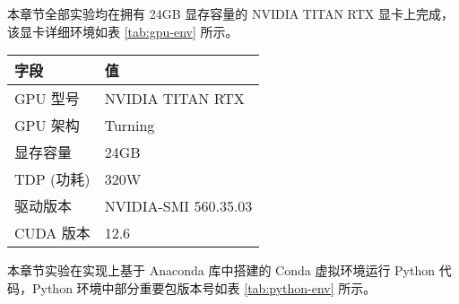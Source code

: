 本章节全部实验均在拥有 24GB 显存容量的 NVIDIA TITAN RTX 显卡上完成，该显卡详细环境如表 \ref{tab:gpu-env} 所示。

\begin{table*}[htbp]
\centering
\caption{实验显卡环境} \label{tab:gpu-env}
\begin{tabular}{ll}
\toprule
\textbf{字段} & \textbf{值}           \\ \midrule
GPU   型号    & NVIDIA TITAN RTX     \\
GPU   架构    & Turning              \\
显存容量        & 24GB                 \\
TDP   (功耗)  & 320W                 \\
驱动版本        & NVIDIA-SMI 560.35.03 \\
CUDA   版本   & 12.6                 \\ \bottomrule
\end{tabular}
\end{table*}

本章节实验在实现上基于 Anaconda 库中搭建的 Conda 虚拟环境运行 Python 代码，Python 环境中部分重要包版本号如表 \ref{tab:python-env} 所示。

